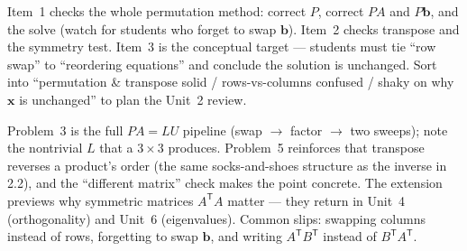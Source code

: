 \documentclass[10pt]{article}
\newcommand{\xx}{\mathbf{x}}
\newcommand{\bb}{\mathbf{b}}
\newcommand{\PP}{P}
\newcommand{\tp}{\mathsf{T}}
\begin{document}
\begin{teachernote}
Item~1 checks the whole permutation method: correct $\PP$, correct $\PP A$ and $\PP\bb$, and the solve
(watch for students who forget to swap $\bb$). Item~2 checks transpose and the symmetry test. Item~3 is
the conceptual target --- students must tie ``row swap'' to ``reordering equations'' and conclude the
solution is unchanged. Sort into ``permutation \& transpose solid / rows-vs-columns confused / shaky on
why $\xx$ is unchanged'' to plan the Unit~2 review.
\end{teachernote}

\begin{teachernote}[Homework]
Problem~3 is the full $\PP A=LU$ pipeline (swap $\to$ factor $\to$ two sweeps); note the nontrivial $L$
that a $3\times3$ produces. Problem~5 reinforces that transpose reverses a product's order (the same
socks-and-shoes structure as the inverse in 2.2), and the ``different matrix'' check makes the point
concrete. The extension previews why symmetric matrices $A^{\tp}A$ matter --- they return in Unit~4
(orthogonality) and Unit~6 (eigenvalues). Common slips: swapping columns instead of rows, forgetting to
swap $\bb$, and writing $A^{\tp}B^{\tp}$ instead of $B^{\tp}A^{\tp}$.
\end{teachernote}
\end{document}
